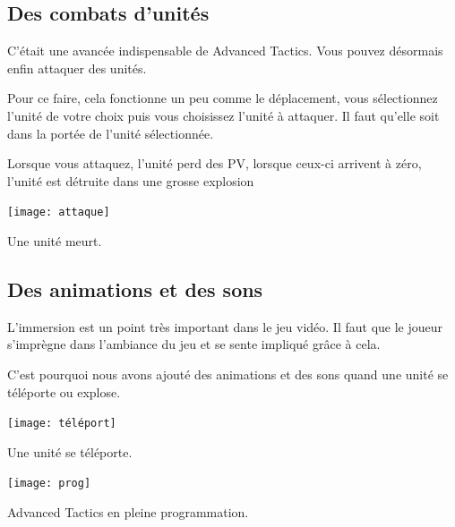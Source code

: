 \documentclass{article}
\begin{document}
\newpage

\subsection{Des combats d'unités}

\par
C'était une avancée indispensable de Advanced Tactics. Vous pouvez désormais enfin attaquer des unités.
\newline

\par
Pour ce faire, cela fonctionne un peu comme le déplacement, vous sélectionnez l'unité de votre choix puis vous choisissez l'unité à attaquer. Il faut qu'elle soit dans la portée de l'unité sélectionnée.
\newline

\par
Lorsque vous attaquez, l'unité perd des PV, lorsque ceux-ci arrivent à zéro, l'unité est détruite dans une grosse explosion
\newline

\begin{center}
\texttt{[image: attaque]}
\par
Une unité meurt.
\newline
\end{center}

\newpage

\subsection{Des animations et des sons}

\par
L'immersion est un point très important dans le jeu vidéo. Il faut que le joueur s'imprègne dans l'ambiance du jeu et se sente impliqué grâce à cela.
\newline

\par
C'est pourquoi nous avons ajouté des animations et des sons quand une unité se téléporte ou explose.
\newline

\begin{center}
\texttt{[image: téléport]}
\par
Une unité se téléporte.
\newline
\end{center}

\newpage

\begin{center}
\texttt{[image: prog]}
\par
Advanced Tactics en pleine programmation.
\newline
\end{center}
\end{document}
